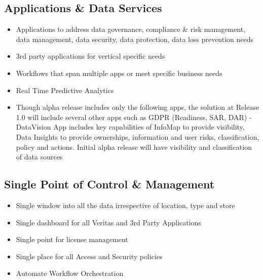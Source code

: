 \documentclass[letterpaper,10pt,english]{sphinxhowto}
\begin{document}
\subsection{Applications \& Data Services}
\label{\detokenize{col/ds/mcdmp_ds_alpha1:applications-data-services}}\begin{itemize}
\item {} 
Applications to address data governance, compliance \& risk management, data management, data security, data protection, data loss prevention needs

\item {} 
3rd party applications for vertical specific needs

\item {} 
Workflows that span multiple apps or meet specific business needs

\item {} 
Real Time Predictive Analytics

\item {} 
Though alpha release includes only the following apps, the solution at Release 1.0 will include several other apps such as GDPR (Readiness, SAR, DAR)
- DataVision App includes key capabilities of InfoMap to provide visibility, Data Insights to provide ownerships, information and user risks, classification, policy and actions. Initial alpha release will have visibility and classification of data sources

\end{itemize}


\subsection{Single Point of Control \& Management}
\label{\detokenize{col/ds/mcdmp_ds_alpha1:single-point-of-control-management}}\begin{itemize}
\item {} 
Single window into all the data irrespective of location, type and store

\item {} 
Single dashboard for all Veritas and 3rd Party Applications

\item {} 
Single point for license management

\item {} 
Single place for all Access and Security policies

\item {} 
Automate Workflow Orchestration

\end{itemize}
\end{document}
